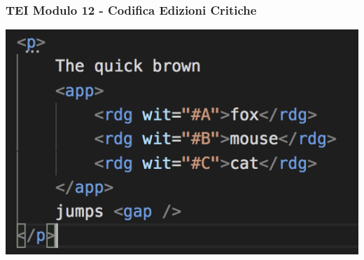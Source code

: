 \begin{frame}
    \frametitle{TEI Modulo 12 - Codifica Edizioni Critiche}
    \addtocounter{nframe}{1}
    


    \begin{center}
        \includegraphics[width=.95\textwidth]{imgs/fox-jumps.png}
    \end{center}

\end{frame}














